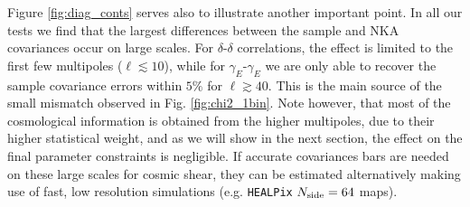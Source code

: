 \documentclass[a4paper,11pt]{article}
\begin{document}
      Figure \ref{fig:diag_conts} serves also to illustrate another important point. In all our tests we find that the largest differences between the sample and NKA covariances occur on large scales. For $\delta$-$\delta$ correlations, the effect is limited to the first few multipoles ($\ell\lesssim10$), while for $\gamma_E$-$\gamma_E$ we are only able to recover the sample covariance errors within $5\%$ for $\ell\gtrsim40$. This is the main source of the small mismatch observed in Fig. \ref{fig:chi2_1bin}. Note however, that most of the cosmological information is obtained from the higher multipoles, due to their higher statistical weight, and as we will show in the next section, the effect on the final parameter constraints is negligible. If accurate covariances bars are needed on these large scales for cosmic shear, they can be estimated alternatively making use of fast, low resolution simulations (e.g. {\tt HEALPix} $N_{\rm side}=64$ maps).
\end{document}
